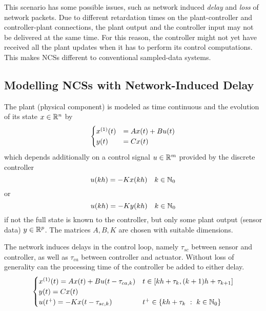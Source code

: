     This scenario has some possible issues, such as network induced \emph{delay} and \emph{loss} of network packets.
    Due to different retardation times on the plant-controller and controller-plant connections, the plant output and the controller input may not be delivered at the same time. For this reason, the controller might not yet have received all the plant updates when it has to perform its control computations. This makes NCSs different to conventional sampled-data systems.

    \subsection{Modelling NCSs with Network-Induced Delay}
        The plant (physical component) is modeled as time continuous and the evolution of its state $x\in\mathbb{R}^{n}$ by
        \begin{equation*}
            \begin{cases}
                \D{x}(t) &= Ax(t) + Bu(t) \\
                y(t) &= Cx(t)
            \end{cases}
        \end{equation*}
        which depends additionally on a control signal $u\in\mathbb{R}^{m}$ provided by the discrete controller
        \begin{equation*}
            u(kh) = -Kx(kh)\quad k\in\mathbb{N}_0
        \end{equation*}
        or
        \begin{equation*}
            u(kh) = -Ky(kh)\quad k\in\mathbb{N}_0
        \end{equation*}
        if not the full state is known to the controller, but only some plant output (sensor data) $y\in\mathbb{R}^{p}$.
        The matrices $A, B, K$ are chosen with suitable dimensions. 

        The network induces delays in the control loop, namely $\tau_{sc}$ between sensor and controller, as well as $\tau_{ca}$ between controller and actuator. Without loss of generality can the processing time of the controller be added to either delay.
        \begin{equation*}
            \begin{cases}
                \D{x}(t) = Ax(t) + Bu(t-\tau_{ca,k}) &
                t\in\compactum{kh+\tau_k}{(k+1)h+\tau_{k+1}}\\
                y(t) = Cx(t) &\\
                u(t^+) = -Kx(t-\tau_{sc,k}) &
                t^+\in\set{kh+\tau_k\with k\in\N_0}
            \end{cases}
        \end{equation*}


